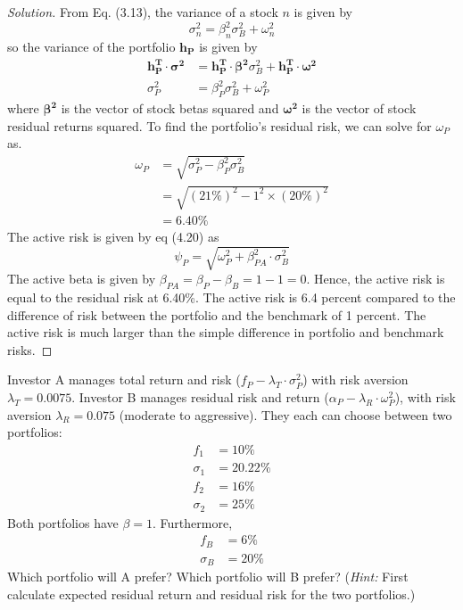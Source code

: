 \begin{proof}[Solution]
 From Eq. (3.13), the variance of a stock $n$ is given by
 \begin{equation*}
  \sigma_{n}^{2}=\beta_{n}^{2}\sigma_{B}^{2} + \omega_{n}^{2}
 \end{equation*}
 so the variance of the portfolio $\bm{h_{P}}$ is given by
 \begin{align*}
  \bm{h_{P}^{T}}\cdot\bm{\sigma^{2}}&=\bm{h_{P}^{T}}\cdot\bm{\beta^{2}}\sigma_{B}^{2} + \bm{h_{P}^{T}}\cdot\bm{\omega^{2}}\\
  \sigma_{P}^{2}&=\beta_{P}^{2}\sigma_{B}^{2}+\omega_{P}^{2}
 \end{align*}
 where $\bm{\beta^{2}}$ is the vector of stock betas squared and $\bm{\omega^{2}}$ is the vector of stock residual returns squared. To find the portfolio's residual risk, we can solve for $\omega_{P}$ as.
 \begin{align*}
  \omega_{P} &= \sqrt{\sigma_{P}^{2}-\beta_{P}^{2}\sigma_{B}^{2}} \\
	     &= \sqrt{(21\%)^{2} - 1^{2}\times (20\%)^{2}} \\
	     &= 6.40\%
 \end{align*}
 The active risk is given by eq (4.20) as 
 \begin{equation*}
  \psi_{P}=\sqrt{\omega_{P}^{2}+\beta_{PA}^{2}\cdot\sigma_{B}^{2}}
 \end{equation*}
 The active beta is given by $\beta_{PA} = \beta_{P}-\beta_{B} = 1 - 1 = 0$. Hence, the active risk is equal to the residual risk at 6.40\%. The active risk is 6.4 percent compared to the difference of risk between the portfolio and the benchmark of 1 percent. The active risk is much larger than the simple difference in portfolio and benchmark risks.
 
\end{proof}


\begin{problem}{4.4}
 Investor A manages total return and risk ($f_{P}-\lambda_{T}\cdot\sigma_{P}^{2}$) with risk aversion $\lambda_{T} = 0.0075$. Investor B manages residual risk and return ($\alpha_{P}-\lambda_{R}\cdot\omega_{P}^{2}$), with risk aversion $\lambda_{R}=0.075$ (moderate to aggressive). They each can choose between two portfolios:
 \begin{align*}
  f_{1}&=10\%\\
  \sigma_{1}&=20.22\%\\
  f_{2}&=16\%\\
  \sigma_{2}&=25\%
 \end{align*}
 Both portfolios have $\beta=1$. Furthermore,
 \begin{align*}
  f_{B}&=6\%\\
  \sigma_{B}&=20\%
 \end{align*}
 Which portfolio will A prefer? Which portfolio will B prefer? (\textit{Hint:} First calculate expected residual return and residual risk for the two portfolios.)

\end{problem}

